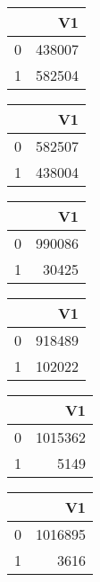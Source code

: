 \bigskip\bigskip
\centering
\begin{tabular}{rr}
  \hline
 & V1 \\ 
  \hline
0 & 438007 \\ 
  1 & 582504 \\ 
   \hline
\end{tabular}

\bigskip\bigskip
\centering
\begin{tabular}{rr}
  \hline
 & V1 \\ 
  \hline
0 & 582507 \\ 
  1 & 438004 \\ 
   \hline
\end{tabular}

\bigskip\bigskip
\centering
\begin{tabular}{rr}
  \hline
 & V1 \\ 
  \hline
0 & 990086 \\ 
  1 & 30425 \\ 
   \hline
\end{tabular}

\bigskip\bigskip
\centering
\begin{tabular}{rr}
  \hline
 & V1 \\ 
  \hline
0 & 918489 \\ 
  1 & 102022 \\ 
   \hline
\end{tabular}

\bigskip\bigskip
\centering
\begin{tabular}{rr}
  \hline
 & V1 \\ 
  \hline
0 & 1015362 \\ 
  1 & 5149 \\ 
   \hline
\end{tabular}

\bigskip\bigskip
\centering
\begin{tabular}{rr}
  \hline
 & V1 \\ 
  \hline
0 & 1016895 \\ 
  1 & 3616 \\ 
   \hline
\end{tabular}

